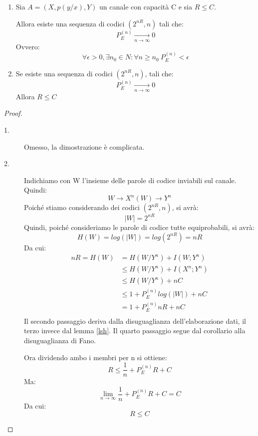 \begin{teorema}
 \mbox{}

 \begin{enumerate}
  \item Sia $A=(X,p(y/x),Y)$ un canale con capacità C e sia $R \le C$.

        \noindent
        Allora esiste una sequenza di codici $(2^{nR},n)$ tali che:
        \[
         P_E^{(n)} \xrightarrow[n \to \infty]{} 0
        \]
        Ovvero:
        \[
         \forall \epsilon>0, \exists n_0 \in N: \forall n \ge n_0 \ P_E^{(n)}< \epsilon
        \]
   \item Se esiste una sequenza di codici $(2^{nR},n)$, tali che:
         \[
          P_E^{(n)} \xrightarrow[n \to \infty]{} 0
         \]
         Allora $R \le C$
 \end{enumerate}
 \begin{proof}
  \mbox{}
  \begin{description}
   \item[1.] Omesso, la dimostrazione è complicata.
   \item[2.] 
    
    Indichiamo con W l'insieme delle parole di codice inviabili sul canale.
    Quindi:
    \[
     W \to X^n(W) \to Y^n
    \]
    \noindent
    Poiché stiamo considerando dei codici $(2^{nR},n)$, si avrà:
    \[
     |W|=2^{nR}
    \]
    Quindi, poiché consideriamo le parole di codice tutte equiprobabili, si avrà:
    \[
     H(W)=log(|W|)=log(2^{nR})=nR
    \]
   Da cui:
   \[\begin{split}
    nR=H(W)&=H(W/Y^n)+I(W;Y^n) \\
        & \le H(W/Y^n)+I(X^n;Y^n) \\
        & \le H(W/Y^n)+nC \\
        & \le 1+P_E^{(n)} log(|W|) +nC \\
        & = 1+P_E^{(n)} nR +nC \\
     \end{split}
   \]
   Il secondo passaggio deriva dalla disuguaglianza dell'elaborazione dati, il terzo invece dal lemma \ref{lsh}.
   Il quarto passaggio segue dal corollario alla disuguaglianza di Fano.

   Ora dividendo ambo i membri per n si ottiene:
   \[
    R \le \frac{1}{n}+P_E^{(n)} R +C
   \]
   Ma:
   \[
    \lim_{n \to \infty} \frac{1}{n}+P_E^{(n)} R +C=C
   \]
   Da cui:
   \[
    R \le C
   \]

  \end{description}

 \end{proof}

\end{teorema}